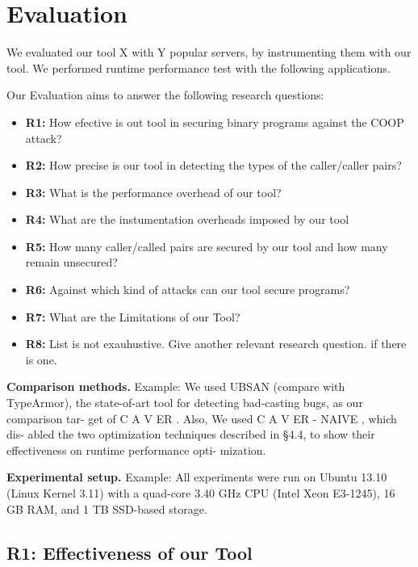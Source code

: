 \chapter{Evaluation}
\label{chapter:Evaluation}
We evaluated our tool X with Y popular servers, by instrumenting them with our tool.
We performed runtime performance test with the following applications.

Our Evaluation aims to answer the following research questions:
\begin{itemize}
 \item \textbf{R1:} How efective is out tool in securing binary programs against the COOP attack?
 
 \item \textbf{R2:} How precise is our tool in detecting the types of the caller/caller pairs?
 
 \item \textbf{R3:} What is the performance overhead of our tool?
 
 \item \textbf{R4:} What are the instumentation overheads imposed by our tool 
 
 \item \textbf{R5:} How many caller/called pairs are secured by our tool and how many remain unsecured?
 
 \item \textbf{R6:} Against which kind of attacks can our tool secure programs?
 
 \item \textbf{R7:} What are the Limitations of our Tool?
 
 \item \textbf{R8:} List is not exauhustive. Give another relevant research question. if there is one.
 
\end{itemize}

\textbf{Comparison methods.} Example: We used UBSAN (compare with TypeArmor), the state-of-art
tool for detecting bad-casting bugs, as our comparison tar-
get of C A V ER . Also, We used C A V ER - NAIVE , which dis-
abled the two optimization techniques described in §4.4,
to show their effectiveness on runtime performance opti-
mization.

\textbf{Experimental setup.} Example: All experiments were run on
Ubuntu 13.10 (Linux Kernel 3.11) with a quad-core 3.40
GHz CPU (Intel Xeon E3-1245), 16 GB RAM, and 1 TB
SSD-based storage.


\section{R1: Effectiveness of our Tool}

